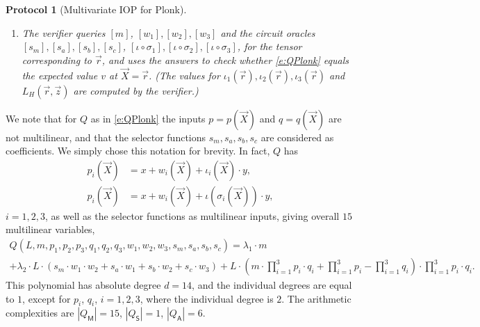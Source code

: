 \documentclass[11pt]{article}
\newtheorem{protocol}[]{Protocol}
\theoremstyle{definition}
\theoremstyle{remark}
\begin{document}
\begin{protocol}[Multivariate IOP for Plonk]
\begin{enumerate}
\item
The verifier queries $[m]$, $[w_1], [w_2], [w_3]$ and the circuit oracles $[s_m], [s_a], [s_b], [s_c]$, $[\iota\circ\sigma_1], [\iota\circ\sigma_2], [\iota\circ\sigma_3]$,  for the tensor corresponding to $\vec r$, and uses the answers  to check whether \eqref{e:QPlonk} equals the expected value $v$ at $\vec X = \vec r$. 
(The values for $\iota_1(\vec r), \iota_2(\vec r), \iota_3(\vec r)$ and $L_H(\vec r, \vec z)$ are computed by the verifier.)
\end{enumerate}
\end{protocol}

We note that for $Q$ as in \eqref{e:QPlonk} the inputs $p= p(\vec X)$ and $q= q(\vec X)$ are not multilinear, and that the selector functions $s_m, s_a, s_b, s_c$ are considered as coefficients.
We simply chose this notation for brevity. 
In fact, $Q$ has  
\begin{align}
\label{e:pi}
p_i (\vec X) &= x + w_i(\vec X) + \iota_i(\vec X)\cdot  y,  
\\
\label{e:qi}
p_i (\vec X) &= x + w_i(\vec X) + \iota(\sigma_i(\vec X))\cdot y,
\end{align}
$i=1,2,3$, as well as the selector functions as multilinear inputs, giving overall $15$ multilinear variables, 
\begin{multline*}
Q(L, m, p_1,p_2,p_3,q_1,q_2, q_3, w_1,w_2, w_3, s_m, s_a, s_b, s_c) = \lambda_1 \cdot m
\\
+ \lambda_2 \cdot L \cdot \left( s_m \cdot w_1\cdot w_2 + s_a \cdot w_1 + s_b \cdot w_2 + s_c\cdot w_3\right)
+ L \cdot  \left(m\cdot \prod_{i=1}^3 p_i\cdot q_i  + \prod_{i=1}^3 p_i - \prod_{i=1}^3 q_i\right)\cdot \prod_{i=1}^3 p_i\cdot q_i.
\end{multline*}
This polynomial has absolute degree $d= 14$, and the individual degrees are equal to $1$, except for $p_i$, $q_i$, $i=1,2,3$, where the individual degree is $2$.
The arithmetic complexities are $|Q_\mathsf M| = 15$, $|Q_\mathsf S| = 1$, $|Q_\mathsf A |= 6$.
\end{document}
